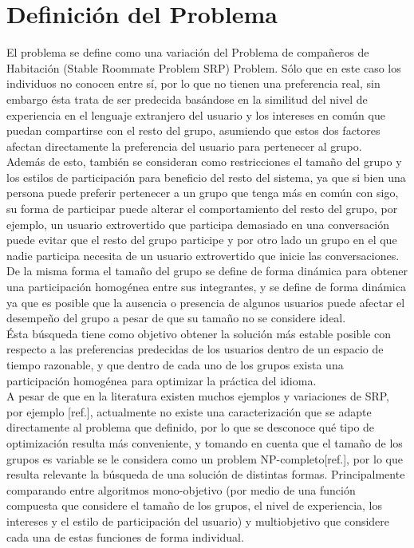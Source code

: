 \section{Definición del Problema}

El problema se define como una variación del Problema de compañeros de Habitación (Stable Roommate Problem SRP) Problem\cite{greenwade93}. Sólo que en este caso los individuos no conocen entre sí, por lo que no tienen una preferencia real, sin embargo ésta trata de ser predecida basándose en la similitud del nivel de experiencia en el lenguaje extranjero del usuario y los intereses en común que puedan compartirse con el resto del grupo, asumiendo que estos dos factores afectan directamente la preferencia del usuario para pertenecer al grupo.\\ 

Además de esto, también se consideran como restricciones el tamaño del grupo y los estilos de participación para beneficio del resto del sistema, ya que si bien una persona puede preferir pertenecer a un grupo que tenga más en común con sigo, su forma de participar puede alterar el comportamiento del resto del grupo, por ejemplo, un usuario extrovertido que participa demasiado en una conversación puede evitar que el resto del grupo participe y por otro lado un grupo en el que nadie participa necesita de un usuario extrovertido que inicie las conversaciones.\\ 

De la misma forma el tamaño del grupo se define de forma dinámica para obtener una participación homogénea entre sus integrantes, y se define de forma dinámica ya que es posible que la ausencia o presencia de algunos usuarios puede afectar el desempeño del grupo a pesar de que su tamaño no se considere ideal.\\

Ésta búsqueda tiene como objetivo obtener la solución más estable posible con respecto a las preferencias predecidas de los usuarios dentro de un espacio de tiempo razonable, y que dentro de cada uno de los grupos exista una participación homogénea para optimizar la práctica del idioma.\\

A pesar de que en la literatura existen muchos ejemplos y variaciones de SRP, por ejemplo [ref.], actualmente no existe una caracterización que se adapte directamente al problema que definido, por lo que se desconoce qué tipo de optimización resulta más conveniente, y tomando en cuenta que el tamaño de los grupos es variable se le considera como un problem NP-completo[ref.], por lo que resulta relevante la búsqueda de una solución de distintas formas. Principalmente comparando entre algoritmos mono-objetivo (por medio de una función compuesta que considere el tamaño de los grupos, el nivel de experiencia, los intereses y el estilo de participación del usuario) y multiobjetivo que considere cada una de estas funciones de forma individual.

